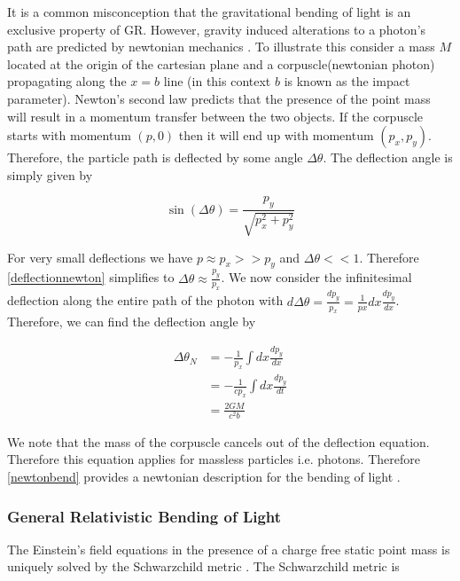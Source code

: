 It is a common misconception that the gravitational bending of light is an exclusive property of GR.
However, gravity induced alterations to a photon's path are predicted by newtonian mechanics \cite{lensingbook}. To illustrate this 
consider a mass $M$ located at the origin of the cartesian plane and a corpuscle(newtonian photon) 
propagating along the $x=b$ line (in this context $b$ is known as the impact parameter). 
Newton's second law predicts that the presence of the point mass will result in a momentum transfer
between the two objects. If the corpuscle starts with 
momentum $(p,0)$ then it will end up with momentum $(p_x,p_y)$.
Therefore, the particle path is deflected by some angle $\Delta \theta$. The deflection angle is 
simply given by 

\begin{equation}
  \sin(\Delta \theta) = \frac{p_y}{\sqrt{p_x^2+p_y^2}}
  \label{deflectionnewton}
\end{equation}


\par For very small deflections we have $p\approx p_x >> p_y$ and $\Delta \theta << 1$. 
Therefore \autoref{deflectionnewton} simplifies to $\Delta \theta
\approx \frac{p_y}{p_x}$. We now consider the infinitesimal deflection along the entire path of the photon with
$d\Delta \theta = \frac{dp_y}{p_x} = \frac{1}{px} dx \frac{dp_y}{dx}$. Therefore, we can find the deflection
angle by 

\begin{equation}
  \begin{split}
  \Delta \theta_N &= -\frac{1}{p_x} \int dx \frac{dp_y}{dx} \\
  &= -\frac{1}{cp_x} \int dx \frac{dp_y}{dt}  \\ 
  &= \frac{2GM}{c^2b}
  \end{split}  
  \label{newtonbend}
\end{equation}

We note that the mass of the corpuscle cancels out of the deflection equation. Therefore this equation applies
for massless particles i.e. photons. Therefore \autoref{newtonbend} provides a newtonian description for the 
bending of light \cite{lensingbook}.

\subsubsection{General Relativistic Bending of Light}
The Einstein's field equations in the presence of a charge free static point mass is uniquely solved by 
the Schwarzchild metric \cite{GR1}. The Schwarzchild metric is

